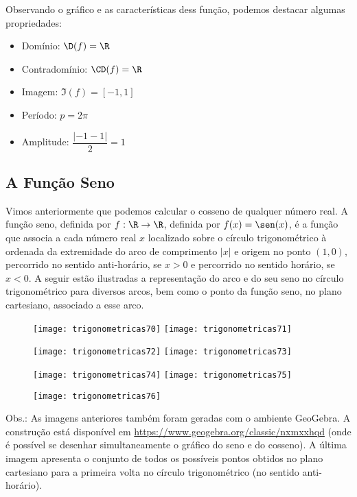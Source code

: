 Observando o gráfico e as características dess função, podemos destacar algumas propriedades:
\begin{itemize}
\item Domínio: $\D(f)=\R$
\item Contradomínio: $\CD(f)=\R$
\item Imagem: $\Im(f)=[-1,1]$
\item Período: $p=2\pi$
\item Amplitude: $\dfrac{|-1-1|}{2}=1$
\end{itemize}

\clearpage
\subsection{A Função Seno}
Vimos anteriormente que podemos calcular o cosseno de qualquer número real. A função seno, definida por $f:\R\to \R$, definida por $f(x)=\sen(x)$, é a função que associa a cada número real $x$ localizado sobre o círculo trigonométrico à ordenada da extremidade do arco de comprimento $|x|$ e origem no ponto $(1,0)$, percorrido no sentido anti-horário, se $x>0$ e percorrido no sentido horário, se $x<0$. A seguir estão ilustradas a representação do arco e do seu seno no círculo trigonométrico para diversos arcos, bem como o ponto da função seno, no plano cartesiano, associado a esse arco.

\begin{figure}[H]
\centering

\texttt{[image: trigonometricas70]}
\texttt{[image: trigonometricas71]}

\texttt{[image: trigonometricas72]}
\texttt{[image: trigonometricas73]}

\texttt{[image: trigonometricas74]}
\texttt{[image: trigonometricas75]}

\end{figure}

\begin{figure}[H]
\centering

\texttt{[image: trigonometricas76]}
\end{figure}


Obs.: As imagens anteriores também foram geradas com o ambiente GeoGebra. A construção está disponível em \url{https://www.geogebra.org/classic/nxmxxhqd} (onde é possível se desenhar simultaneamente o gráfico do seno e do cosseno). A última imagem apresenta o conjunto de todos os possíveis pontos obtidos no plano cartesiano para a primeira volta no círculo trigonométrico (no sentido anti-horário).

